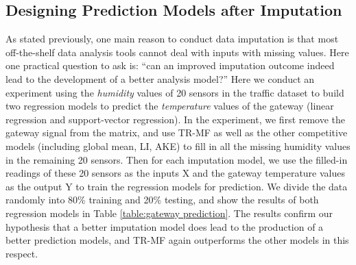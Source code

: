 \subsection{Designing Prediction Models after Imputation}\label{subsec:furtherPredict}
As stated previously, one main reason to conduct data imputation is that most off-the-shelf data analysis tools cannot deal with inputs with missing values.
Here one practical question to ask is: ``can an improved imputation outcome indeed lead to the development of a better analysis model?''
Here we conduct an experiment using the {\em humidity} values of 20 sensors in the traffic dataset to build two regression models to predict the {\em temperature} values of the gateway (linear regression and support-vector regression).
In the experiment, we first remove the gateway signal from the matrix, and use TR-MF as well as the other competitive models (including global mean, LI, AKE) to fill in all the missing humidity values in the remaining 20 sensors.
Then for each imputation model, we use the filled-in readings of these 20 sensors as the inputs X and the gateway temperature values as the output Y to train the regression models for prediction.
We divide the data randomly into 80\% training and 20\% testing, and show the results of both regression models in Table \ref{table:gateway prediction}.
The results confirm our hypothesis that a better imputation model does lead to the production of a better prediction models, and TR-MF again outperforms the other models in this respect.

